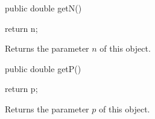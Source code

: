 \begin{code}

   public double getN()\begin{hide} {
      return n;
   }\end{hide}
\end{code}
\begin{tabb} Returns the parameter $n$ of this object.
\end{tabb}
\begin{code}

   public double getP()\begin{hide} {
      return p;
   }\end{hide}
\end{code}
\begin{tabb} Returns the parameter $p$ of this object.
\end{tabb}
